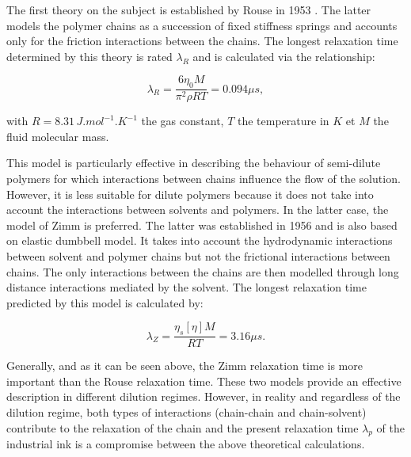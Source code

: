 \documentclass[twocolumn,10pt]{asme2ej}
\begin{document}
The first theory on the subject is established by Rouse in 1953 \cite{rouse1953theory}.  The latter models the polymer chains as a succession of fixed stiffness springs and accounts only for the friction interactions between the chains. The longest relaxation time determined by this theory is rated $\lambda_R$ and is calculated via the relationship:

\begin{equation}
    \lambda_R = \frac{6 \eta_0 M}{\pi^2 \rho R T} = 0.094 \mu s,
    \label{rouse} 
\end{equation}

with $R = 8.31 \, J.mol^{-1}.K^{-1}$ the gas constant, $T$ the temperature in $K$ et $M$ the fluid molecular mass. 

This model is particularly effective in describing the behaviour of semi-dilute polymers for which interactions between chains influence the flow of the solution. However, it is less suitable for dilute polymers because it does not take into account the interactions between solvents and polymers. In the latter case, the model of Zimm \cite{zimm1956dynamics} is preferred. The latter was established in 1956 and is also based on elastic dumbbell model. It takes into account the hydrodynamic interactions between solvent and polymer chains but not the frictional interactions between chains. The only interactions between the chains are then modelled through long distance interactions mediated by the solvent. The longest relaxation time predicted by this model is calculated by:

\begin{equation}
    \lambda_Z = \frac{\eta_s [\eta] M}{RT} = 3.16 \mu s.
    \label{zimm} 
\end{equation}

Generally, and as it can be seen above, the Zimm relaxation time is more important than the Rouse relaxation time. These two models provide an effective description in different dilution regimes. However, in reality and regardless of the dilution regime, both types of interactions (chain-chain and chain-solvent) contribute to the relaxation of the chain and the present relaxation time $\lambda_p$ of the industrial ink is a compromise between the above theoretical calculations.
\end{document}
